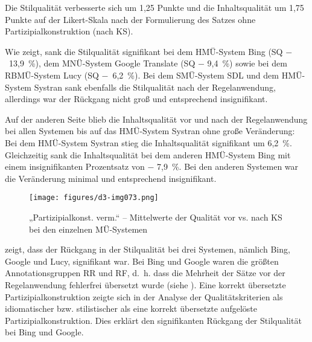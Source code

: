 Die Stilqualität verbesserte sich um 1,25 Punkte und die Inhaltsqualität um 1,75 Punkte auf der Likert-Skala nach der Formulierung des Satzes ohne Partizipialkonstruktion (nach KS).


Wie  zeigt, sank die Stilqualität signifikant bei dem HMÜ-System Bing (SQ $-$~13,9~\%), dem MNÜ-System Google Translate (SQ $-$ 9,4~\%) sowie bei dem RBMÜ-System Lucy (SQ $-$~6,2~\%). Bei dem SMÜ-System SDL und dem HMÜ-System Systran sank ebenfalls die Stilqualität nach der Regelanwendung, allerdings war der Rückgang nicht groß und entsprechend insignifikant.

Auf der anderen Seite blieb die Inhaltsqualität vor und nach der Regelanwendung bei allen Systemen bis auf das HMÜ-System Systran ohne große Veränderung: Bei dem HMÜ-System Systran stieg die Inhaltsqualität signifikant um 6,2~\%. Gleichzeitig sank die Inhaltsqualität bei dem anderen HMÜ-System Bing\textbf{ }mit einem insignifikanten Prozentsatz von $-$ 7,9~\%. Bei den anderen Systemen war die Veränderung minimal und entsprechend insignifikant.


\begin{figure}
\texttt{[image: figures/d3-img073.png]}
\caption{\label{fig:05:82}„Partizipialkonst. verm.“ -- Mittelwerte der Qualität vor vs. nach KS bei den einzelnen MÜ-Systemen   }
\end{figure}

 zeigt, dass der Rückgang in der Stilqualität bei drei Systemen, nämlich Bing, Google und Lucy, signifikant war. Bei Bing und Google waren die größten Annotationsgruppen RR und RF, d.~h. dass die Mehrheit der Sätze vor der Regelanwendung fehlerfrei übersetzt wurde (siehe ). Eine korrekt übersetzte Partizipialkonstruktion zeigte sich in der Analyse der Qualitätskriterien als idiomatischer bzw. stilistischer als eine korrekt übersetzte aufgelöste Partizipialkonstruktion. Dies erklärt den signifikanten Rückgang der Stilqualität bei Bing und Google.


